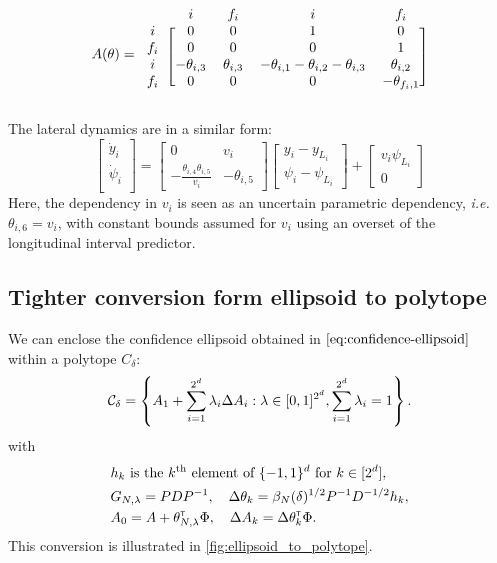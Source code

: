 \documentclass{article}
\begin{document}
\begin{equation*}
A(\theta)
=
\begin{blockarray}{ccccc}
 & i & f_i & i & f_i \\
\begin{block}{c[cccc]}
i & 0 & 0 & 1 & 0 \\
f_i & 0 & 0 & 0 & 1 \\
i & -\theta_{i,3} & \theta_{i,3} & -\theta_{i,1}-\theta_{i,2}-\theta_{i,3} & \theta_{i,2} \\
f_i & 0 & 0 & 0 & -\theta_{f_i,1} \\
\end{block}
\end{blockarray}
\end{equation*}

The lateral dynamics are in a similar form:
\begin{equation*}
\begin{bmatrix}
\dot{y}_i \\
\dot{\psi}_i \\
\end{bmatrix}
=
\begin{bmatrix}
0 & v_i \\
-\frac{\theta_{i,4} \theta_{i,5}}{v_i} & -\theta_{i,5}
\end{bmatrix}
\begin{bmatrix}
y_i - y_{L_i} \\
\psi_i - \psi_{L_i}
\end{bmatrix}
+
\begin{bmatrix}
v_i\psi_{L_i} \\
0
\end{bmatrix}
\end{equation*}
Here, the dependency in $v_i$ is seen as an uncertain parametric dependency, \emph{i.e.} $\theta_{i,6}=v_i$, with constant bounds assumed for $v_i$ using an overset of the longitudinal interval predictor.

\subsection{Tighter conversion form ellipsoid to polytope}
\label{sec:tight-polytope}
\begin{lemma}
\label{lem:tight_polytope}
We can enclose the confidence ellipsoid obtained in $\eqref{eq:confidence-ellipsoid}$ within a polytope $C_\delta$:
\begin{equation}
     \mathcal{C}_\delta = \left\{ A_{1}+\sum_{i=1}^{2^d}\lambda_{i}\Delta A_{i}: \lambda\in[0, 1]^{2^d},  \sum_{i=1}^{2^d}\lambda_{i}=1\right\}.
\end{equation}
with 
\begin{align*}
    &h_k \text{ is the }k^\text{th}\text{ element of }\{-1,1\}^d\text{ for } k\in[2^d],\\
    &G_{N,\lambda} = PDP^{-1}, \quad \Delta\theta_k = \beta_{N}(\delta)^{1/2} P^{-1}D^{-1/2} h_k, \\
    &A_0 = A + \theta_{N,\lambda}^{\mathsf{\scriptscriptstyle T}}\Phi, \quad \Delta A_k = \Delta\theta_k^{\mathsf{\scriptscriptstyle T}}\Phi.
\end{align*}
This conversion is illustrated in \autoref{fig:ellipsoid_to_polytope}.
\end{lemma}
\end{document}
